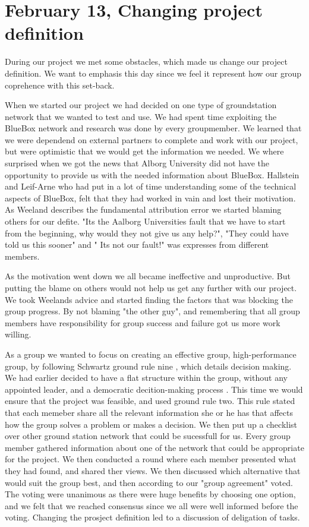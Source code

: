 \section{February 13, Changing project definition}

During our project we met some obstacles, which made us change our project definition. We want to emphasis this day since we feel it represent how our group coprehence with this set-back.

When we started our project we had decided on one type of groundstation network that we wanted to test and use. We had spent time exploiting the BlueBox network and research was done by every groupmember. We learned that we were dependend on external partners to complete and work with our project, but were optimistic that we would get the information we needed. We where surprised when we got the news that Alborg University did not have the opportunity to provide us with the needed information about BlueBox. Hallstein and Leif-Arne who had put in a lot of time understanding some of the technical aspects of BlueBox, felt that they had worked in vain and lost their motivation. As Weeland describes the fundamental attribution error \cite{EffectiveTeamMembers} we started blaming others for our defite. "Its the Aalborg Universities fault that we have to start from the beginning, why would they not give us any help?", "They could have told us this sooner" and " Its not our fault!" was expresses from different members. 

As the motivation went down we all became ineffective and unproductive. But putting the blame on others would not help us get any further with our project. We took Weelands advice and started finding the factors that was blocking the group progress. By not blaming "the other guy", and remembering that all group members have responsibility for group success and failure got us more work willing. 

As a group we wanted to focus on creating an effective group, high-performance group, by following Schwartz ground rule nine \cite{EffectiveGroups}, which details decision making. We had earlier decided to have a flat structure within the group, without any appointed leader, and a democratic decition-making process \cite{EffectiveGroups}. This time we would ensure that the project was feasible, and used ground rule two. This rule stated that each memeber share all the relevant information she or he has that affects how the group solves a problem or makes a decision. We then put up a checklist over other ground station network that could be sucessfull for us. Every group member gathered information about one of the network that could be appropriate for the project. We then conducted a round where each member presented what they had found, and shared ther views. We then discussed which alternative that would suit the group best, and then according to our "group agreement" voted. The voting were unanimous as there were huge benefits by choosing one option, and we felt that we reached consensus since we all were well informed before the voting. Changing the prosject definition led to a discussion of deligation of tasks. 

